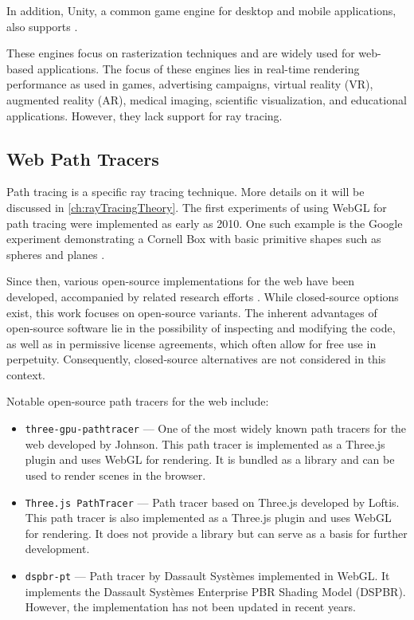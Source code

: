 In addition, \gls{Unity}, a common game engine for desktop and mobile applications, also supports  \cite{unityWebGLCompatibility}.

These engines focus on rasterization techniques and are widely used for web-based applications. The focus of these engines lies in real-time rendering performance as used in games, advertising campaigns, virtual reality (VR), augmented reality (AR), medical imaging, scientific visualization, and educational applications. However, they lack support for ray tracing.

\subsection*{Web Path Tracers}
\label{sec:web-path-tracers}

Path tracing is a specific ray tracing technique. More details on it will be discussed in \autoref{ch:rayTracingTheory}. The first experiments of using \gls{WebGL} for path tracing were implemented as early as 2010. One such example is the Google experiment demonstrating a Cornell Box \cite{goral1984modeling} with basic primitive shapes such as spheres and planes \cite{pathTracerWallace}.

Since then, various open-source implementations for the web have been developed, accompanied by related research efforts \cite{academicWebGLPathTracer, academicWebGLPathTracer2}. While closed-source options exist, this work focuses on open-source variants. The inherent advantages of open-source software lie in the possibility of inspecting and modifying the code, as well as in permissive license agreements, which often allow for free use in perpetuity. Consequently, closed-source alternatives are not considered in this context.

Notable open-source path tracers for the web include:

\begin{itemize}
  \item{\texttt{three-gpu-pathtracer}} \cite{ThreeJsPathTracerJohnson} — One of the most widely known path tracers for the web developed by Johnson. This path tracer is implemented as a \gls{Three.js} plugin and uses \gls{WebGL} for rendering.  It is bundled as a library and can be used to render scenes in the browser.
  \item{\texttt{Three.js PathTracer}} \cite{ThreeJsPathTracerLoftis} — Path tracer based on \gls{Three.js} developed by Loftis. This path tracer is also implemented as a \gls{Three.js} plugin and uses \gls{WebGL} for rendering. It does not provide a library but can serve as a basis for further development.
  \item{\texttt{dspbr-pt}} \cite{PathTracerDassault} — Path tracer by Dassault Systèmes implemented in \gls{WebGL}. It implements the Dassault Systèmes Enterprise PBR Shading Model (\gls{DSPBR}). However, the implementation has not been updated in recent years.
\end{itemize}

